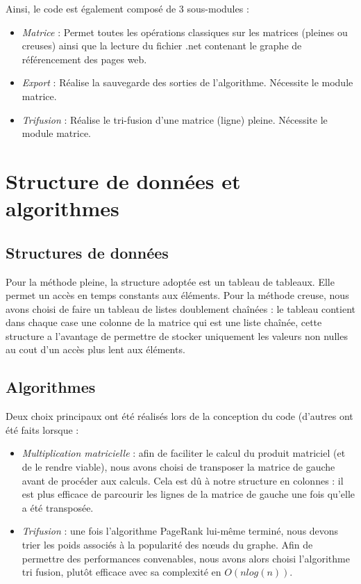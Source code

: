 \documentclass{NewTeX}
\begin{document}
 Ainsi, le code est également composé de 3 sous-modules :
\begin{itemize}
    \item \textit{Matrice} : Permet toutes les opérations classiques sur les matrices (pleines ou creuses) ainsi que la lecture du fichier .net contenant le graphe de référencement des pages web.
    \item \textit{Export} : Réalise la sauvegarde des sorties de l'algorithme. Nécessite le module matrice.
    \item \textit{Trifusion} : Réalise le tri-fusion d'une matrice (ligne) pleine. Nécessite le module matrice.
\end{itemize}

\section{Structure de données et algorithmes}
\subsection{Structures de données}

Pour la méthode pleine, la structure adoptée est un tableau de tableaux. Elle permet un accès en temps constants aux éléments. 
Pour la méthode creuse, nous avons choisi de faire un tableau de listes doublement chaînées : le tableau contient dans chaque case une colonne de la matrice qui est une liste chaînée, cette structure a l'avantage de permettre de stocker uniquement les valeurs non nulles au cout d'un accès plus lent aux éléments.

\subsection{Algorithmes}
Deux choix principaux ont été réalisés lors de la conception du code (d'autres ont été faits lorsque  :
\begin{itemize}
    \item \textit{Multiplication matricielle} : afin de faciliter le calcul du produit matriciel (et de le rendre viable), nous avons choisi de transposer la matrice de gauche avant de procéder aux calculs. Cela est dû à notre structure en colonnes : il est plus efficace de parcourir les lignes de la matrice de gauche une fois qu'elle a été transposée.
    \item \textit{Trifusion} : une fois l'algorithme PageRank lui-même terminé, nous devons trier les poids associés à la popularité des nœuds du graphe. Afin de permettre des performances convenables, nous avons alors choisi l'algorithme tri fusion, plutôt efficace avec sa complexité en $O(nlog(n))$.
\end{itemize}
\end{document}
